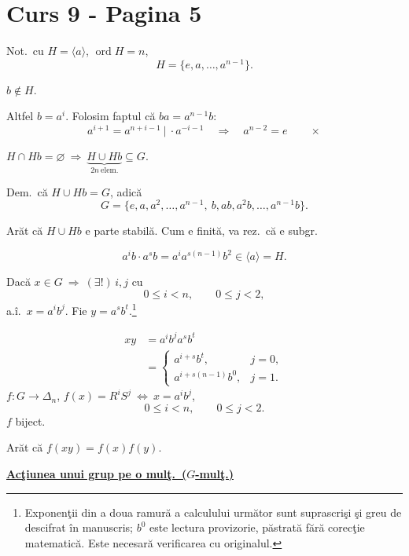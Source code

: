
\section*{Curs 9 - Pagina 5}

\noindent Not.\ cu $H=\langle a\rangle$, $\operatorname{ord}H=n$,
\[
H=\{e,a,\ldots,a^{n-1}\}.
\]

\noindent $b\notin H$.

\noindent Altfel $b=a^i$. Folosim faptul că $ba=a^{n-1}b$:
\[
a^{i+1}=a^{n+i-1}\ \big|\ \cdot a^{-i-1}
\quad\Longrightarrow\quad a^{n-2}=e\qquad\times
\]

\bigskip
\noindent $H\cap Hb=\varnothing\ \Longrightarrow\ \underbrace{H\cup Hb}_{2n\ \text{elem.}}\subseteq G$.

\bigskip
\noindent Dem.\ că $H\cup Hb=G$, adică
\[
G=\{e,a,a^2,\ldots,a^{n-1},\ b,ab,a^2b,\ldots,a^{n-1}b\}.
\]

\noindent Arăt că $H\cup Hb$ e parte stabilă. Cum e finită, va rez.\ că e subgr.

\[
a^i b\cdot a^s b=a^i a^{s(n-1)}b^2\in\langle a\rangle=H.
\]

\bigskip
\noindent Dacă $x\in G\ \Longrightarrow\ (\exists!)\,i,j$ cu
\[
0\leq i<n,\qquad 0\leq j<2,
\]
\noindent a.î.\ $x=a^i b^j$. Fie $y=a^s b^t$.\footnote{Exponenţii din a doua ramură a calculului următor sunt suprascrişi şi greu de descifrat în manuscris; $b^0$ este lectura provizorie, păstrată fără corecţie matematică. Este necesară verificarea cu originalul.}

\[
\begin{aligned}
xy&=a^i b^j a^s b^t\\
  &=\begin{cases}
      a^{i+s}b^t, & j=0,\\[2pt]
      a^{i+s(n-1)}b^0, & j=1.
    \end{cases}
\end{aligned}
\]
\bigskip
\noindent $f:G\longrightarrow\Delta_n$,\quad
$f(x)=R^iS^j\ \Longleftrightarrow\ x=a^i b^j$,
\[
0\leq i<n,\qquad 0\leq j<2.
\]
\noindent $f$ biject.

\noindent Arăt că $f(xy)=f(x)f(y)$.

\bigskip
\noindent\underline{\textbf{Acţiunea unui grup pe o mulţ.\ ($G$-mulţ.)}}

